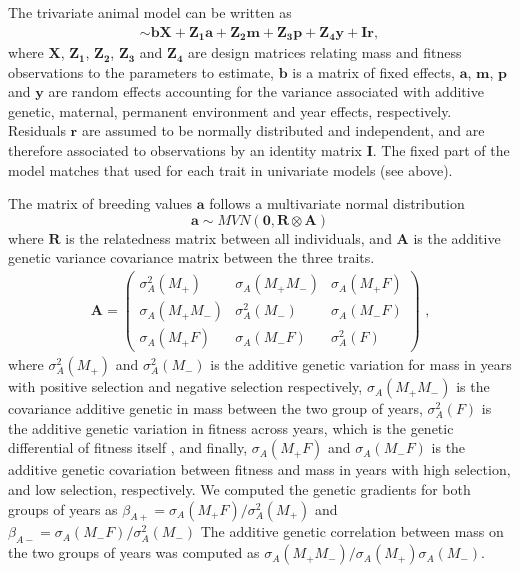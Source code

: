 The trivariate animal model can be written as
\begin{align*}
[\boldsymbol{M_+},
\boldsymbol{M_-},
\boldsymbol{F}]
\sim
\boldsymbol{bX}+\boldsymbol{Z_1a}+\boldsymbol{Z_2m}+\boldsymbol{Z_3p}+\boldsymbol{Z_4y}+\boldsymbol{Ir,}
\end{align*}
where $\boldsymbol{X}$, $\boldsymbol{Z_1}$, $\boldsymbol{Z_2}$, $\boldsymbol{Z_3}$ and $\boldsymbol{Z_4}$ are design matrices relating mass and fitness observations to the parameters to estimate, $\boldsymbol{b}$ is a matrix of fixed effects, $\boldsymbol{a}$, $\boldsymbol{m}$, $\boldsymbol{p}$ and $\boldsymbol{y}$ are random effects accounting for the variance associated with additive genetic, maternal, permanent environment and year effects, respectively. Residuals $\boldsymbol{r}$ are assumed to be normally distributed and independent, and are therefore associated to observations by an identity matrix $\boldsymbol{I}$. The fixed part of the model matches that used for each trait in univariate models (see above).

The matrix of breeding values $\boldsymbol{a}$ follows a multivariate normal distribution
\[\boldsymbol{a}
\sim MVN\left(\boldsymbol{0},
\boldsymbol{R \otimes A}
\right)\]
where $\boldsymbol{R}$ is the relatedness matrix between all individuals, and $\boldsymbol{A}$ is the additive genetic variance covariance matrix between the three traits.
\begin{align*}
\boldsymbol{A}=
\begin{pmatrix}
\sigma_{A}^2(M_+) & \sigma_{A}(M_+M_-) & \sigma_{A}(M_+F)\\
\sigma_{A}(M_+M_-)& \sigma_{A}^2(M_-)	 & \sigma_{A}(M_-F)\\
\sigma_{A}(M_+F)	&	\sigma_{A}(M_-F)	 &\sigma_{A}^2(F)
\end{pmatrix}
\text{ ,}
\end{align*}
where $\sigma_{A}^2(M_+)$ and $\sigma_{A}^2(M_-)$ is the additive genetic variation for mass in years with positive selection and negative selection respectively, $\sigma_{A}(M_+M_-)$ is the covariance additive genetic in mass between the two group of years, $\sigma_{A}^2(F)$ is the additive genetic variation in fitness across years, which is the genetic differential of fitness itself \parencite{Fisher1958}, and finally, $\sigma_{A}(M_+F)$ and $\sigma_{A}(M_-F)$ is the additive genetic covariation between fitness and mass in years with high selection, and low selection, respectively. 
We computed the genetic gradients for both groups of years as $\beta_{A+} = \sigma_{A}(M_+F) /\sigma_{A}^2(M_+)$ and $\beta_{A-} = \sigma_{A}(M_-F) /\sigma_{A}^2(M_-)$ 
The additive genetic correlation between mass on the two groups of years was computed as $\sigma_{A}(M_+M_-) /\sigma_{A}(M_+)\sigma_{A}(M_-)$.

